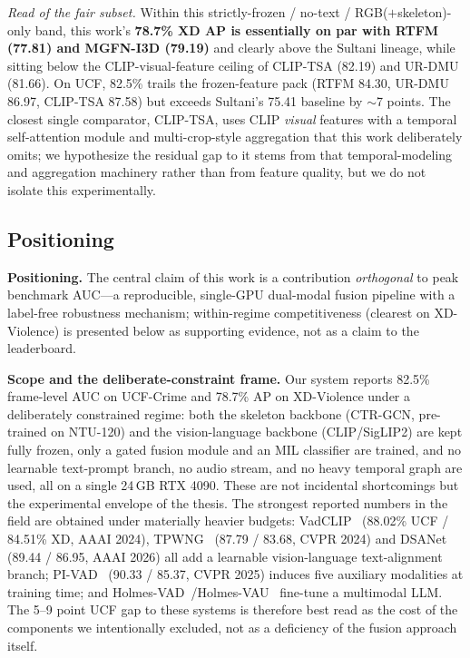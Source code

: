 \begin{table}[p]
\vspace{2pt}
\footnotesize
\begin{flushleft}
\textit{Read of the fair subset.} Within this strictly-frozen / no-text /
RGB($+$skeleton)-only band, this work's \textbf{78.7\% XD AP is essentially on
par with RTFM (77.81) and MGFN-I3D (79.19)} and clearly
above the Sultani lineage, while sitting below the CLIP-visual-feature ceiling
of CLIP-TSA (82.19) and UR-DMU (81.66). On UCF, 82.5\% trails the frozen-feature
pack (RTFM 84.30, UR-DMU 86.97, CLIP-TSA 87.58) but exceeds Sultani's 75.41
baseline by $\sim$7 points. The closest single comparator, CLIP-TSA, uses CLIP
\emph{visual} features with a temporal self-attention module and
multi-crop-style aggregation that this work deliberately omits; we hypothesize
the residual gap to it stems from that temporal-modeling and aggregation
machinery rather than from feature quality, but we do not isolate this
experimentally.
\end{flushleft}
\end{table}

\subsection{Positioning}
\label{sec:sota-positioning}

\noindent\textbf{Positioning.} The central claim of this work is a contribution
\emph{orthogonal} to peak benchmark AUC---a reproducible, single-GPU dual-modal
fusion pipeline with a label-free robustness mechanism; within-regime
competitiveness (clearest on XD-Violence) is presented below as supporting
evidence, not as a claim to the leaderboard.\par\medskip

\noindent\textbf{Scope and the deliberate-constraint frame.}
Our system reports 82.5\% frame-level AUC on UCF-Crime and 78.7\% AP on
XD-Violence under a deliberately constrained regime: both the skeleton backbone
(CTR-GCN, pre-trained on NTU-120) and the vision-language backbone
(CLIP/SigLIP2) are kept fully frozen, only a gated fusion module and an MIL
classifier are trained, and no learnable text-prompt branch, no audio stream,
and no heavy temporal graph are used, all on a single 24\,GB RTX 4090. These are
not incidental shortcomings but the experimental envelope of the thesis. The
strongest reported numbers in the field are obtained under materially heavier
budgets: VadCLIP~\cite{wu2024vadclip} (88.02\% UCF / 84.51\% XD, AAAI 2024),
TPWNG~\cite{yang2024tpwng} (87.79 / 83.68,
CVPR 2024) and DSANet~\cite{yin2026dsanet} (89.44 / 86.95, AAAI 2026) all add a
learnable vision-language text-alignment branch; PI-VAD~\cite{majhi2025pivad}
(90.33 / 85.37, CVPR 2025) induces
five auxiliary modalities at training time; and
Holmes-VAD~\cite{zhang2024holmesvad}/Holmes-VAU~\cite{zhang2025holmesvau}
fine-tune a multimodal LLM. The 5--9 point UCF gap to these systems is
therefore best read as the cost of the components we intentionally excluded,
not as a deficiency of the fusion approach itself.

